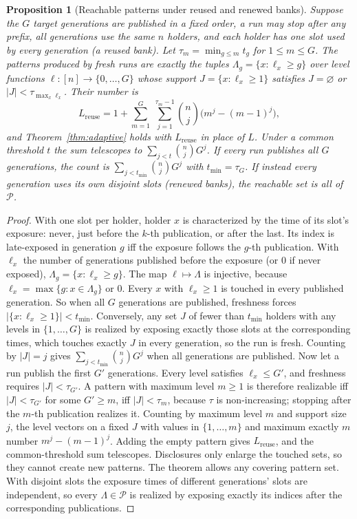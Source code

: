 \documentclass[pdflatex,sn-mathphys-num]{sn-jnl}
\theoremstyle{plain}
\newtheorem{proposition}[theorem]{Proposition}
\theoremstyle{definition}
\begin{document}
\begin{proposition}[Reachable patterns under reused and renewed banks]\label{prop:patterns}
Suppose the $G$ target generations are published in a fixed order, a run may stop after any prefix, all generations use the same $n$ holders, and each holder has one slot used by every generation (a reused bank). Let $\tau_m=\min_{g\le m}t_g$ for $1\le m\le G$. The patterns produced by fresh runs are exactly the tuples $\Lambda_g=\{x:\ell_x\ge g\}$ over level functions $\ell:[n]\to\{0,\dots,G\}$ whose support $J=\{x:\ell_x\ge1\}$ satisfies $J=\varnothing$ or $|J|<\tau_{\max_x\ell_x}$. Their number is
\[
 L_{\mathrm{reuse}}=1+\sum_{m=1}^{G}\ \sum_{j=1}^{\tau_m-1}\binom nj\big(m^j-(m-1)^j\big),
\]
and Theorem~\ref{thm:adaptive} holds with $L_{\mathrm{reuse}}$ in place of $L$. Under a common threshold $t$ the sum telescopes to $\sum_{j<t}\binom njG^j$. If every run publishes all $G$ generations, the count is $\sum_{j<t_{\min}}\binom njG^j$ with $t_{\min}=\tau_G$. If instead every generation uses its own disjoint slots (renewed banks), the reachable set is all of $\mathcal P$.
\end{proposition}
\begin{proof}
With one slot per holder, holder $x$ is characterized by the time of its slot's exposure: never, just before the $k$-th publication, or after the last. Its index is late-exposed in generation $g$ iff the exposure follows the $g$-th publication. With $\ell_x$ the number of generations published before the exposure (or $0$ if never exposed), $\Lambda_g=\{x:\ell_x\ge g\}$. The map $\ell\mapsto\Lambda$ is injective, because $\ell_x=\max\{g:x\in\Lambda_g\}$ or $0$. Every $x$ with $\ell_x\ge1$ is touched in every published generation. So when all $G$ generations are published, freshness forces $|\{x:\ell_x\ge1\}|<t_{\min}$. Conversely, any set $J$ of fewer than $t_{\min}$ holders with any levels in $\{1,\dots,G\}$ is realized by exposing exactly those slots at the corresponding times, which touches exactly $J$ in every generation, so the run is fresh. Counting by $|J|=j$ gives $\sum_{j<t_{\min}}\binom njG^j$ when all generations are published. Now let a run publish the first $G'$ generations. Every level satisfies $\ell_x\le G'$, and freshness requires $|J|<\tau_{G'}$. A pattern with maximum level $m\ge1$ is therefore realizable iff $|J|<\tau_{G'}$ for some $G'\ge m$, iff $|J|<\tau_m$, because $\tau$ is non-increasing; stopping after the $m$-th publication realizes it. Counting by maximum level $m$ and support size $j$, the level vectors on a fixed $J$ with values in $\{1,\dots,m\}$ and maximum exactly $m$ number $m^j-(m-1)^j$. Adding the empty pattern gives $L_{\mathrm{reuse}}$, and the common-threshold sum telescopes. Disclosures only enlarge the touched sets, so they cannot create new patterns. The theorem allows any covering pattern set. With disjoint slots the exposure times of different generations' slots are independent, so every $\Lambda\in\mathcal P$ is realized by exposing exactly its indices after the corresponding publications.
\end{proof}
\end{document}
